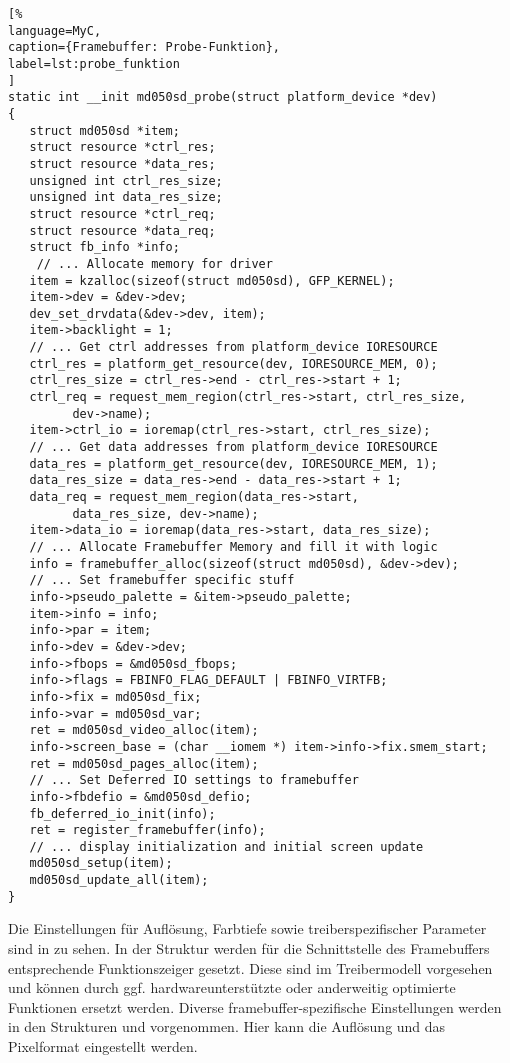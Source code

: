 \begin{lstlisting}[%
language=MyC,
caption={Framebuffer: Probe-Funktion},
label=lst:probe_funktion
]
static int __init md050sd_probe(struct platform_device *dev)
{
   struct md050sd *item;
   struct resource *ctrl_res;
   struct resource *data_res;
   unsigned int ctrl_res_size;
   unsigned int data_res_size;
   struct resource *ctrl_req;
   struct resource *data_req;
   struct fb_info *info;
	// ... Allocate memory for driver
   item = kzalloc(sizeof(struct md050sd), GFP_KERNEL);
   item->dev = &dev->dev;
   dev_set_drvdata(&dev->dev, item);
   item->backlight = 1;
   // ... Get ctrl addresses from platform_device IORESOURCE
   ctrl_res = platform_get_resource(dev, IORESOURCE_MEM, 0);
   ctrl_res_size = ctrl_res->end - ctrl_res->start + 1;
   ctrl_req = request_mem_region(ctrl_res->start, ctrl_res_size,
         dev->name);
   item->ctrl_io = ioremap(ctrl_res->start, ctrl_res_size);
   // ... Get data addresses from platform_device IORESOURCE
   data_res = platform_get_resource(dev, IORESOURCE_MEM, 1);
   data_res_size = data_res->end - data_res->start + 1;
   data_req = request_mem_region(data_res->start,
         data_res_size, dev->name);
   item->data_io = ioremap(data_res->start, data_res_size);
   // ... Allocate Framebuffer Memory and fill it with logic
   info = framebuffer_alloc(sizeof(struct md050sd), &dev->dev);
   // ... Set framebuffer specific stuff
   info->pseudo_palette = &item->pseudo_palette;
   item->info = info;
   info->par = item;
   info->dev = &dev->dev;
   info->fbops = &md050sd_fbops;
   info->flags = FBINFO_FLAG_DEFAULT | FBINFO_VIRTFB;
   info->fix = md050sd_fix;
   info->var = md050sd_var;
   ret = md050sd_video_alloc(item);
   info->screen_base = (char __iomem *) item->info->fix.smem_start;
   ret = md050sd_pages_alloc(item);
   // ... Set Deferred IO settings to framebuffer
   info->fbdefio = &md050sd_defio;
   fb_deferred_io_init(info);
   ret = register_framebuffer(info);
   // ... display initialization and initial screen update
   md050sd_setup(item);
   md050sd_update_all(item);
}
\end{lstlisting}
Die Einstellungen für Auflösung, Farbtiefe sowie treiberspezifischer Parameter sind in  zu sehen.  In der Struktur  werden für die Schnittstelle des Framebuffers entsprechende Funktionszeiger gesetzt. Diese sind im Treibermodell vorgesehen und können durch ggf. hardwareunterstützte oder anderweitig optimierte Funktionen ersetzt werden. Diverse framebuffer-spezifische Einstellungen werden in den Strukturen  und  vorgenommen. Hier kann die Auflösung und das Pixelformat eingestellt werden. 

